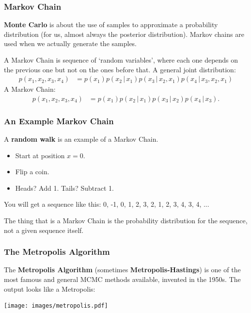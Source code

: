 \documentclass{beamer}
\newcommand{\given}{\,|\,}
\begin{document}
\begin{frame}
\frametitle{Markov Chain}
{\bf Monte Carlo} is about the use of samples to approximate a probability
distribution (for us, almost always the posterior distribution). Markov chains
are used when we actually generate the samples.
\pause

A Markov Chain is sequence of `random variables', where each one
depends on the previous one but not on the ones before that.
A general joint distribution:
\begin{align}
p(x_1, x_2, x_3, x_4) &= p(x_1)p(x_2 \given x_1)p(x_3 \given x_2, x_1)
                    p(x_4 \given x_3, x_2, x_1)
\end{align}
A Markov Chain:
\begin{align}
p(x_1, x_2, x_3, x_4) &= p(x_1)p(x_2 \given x_1)p(x_3 \given x_2)p(x_4 \given x_3).
\end{align}


\end{frame}


\begin{frame}
\frametitle{An Example Markov Chain}
A {\bf random walk} is an example of a Markov Chain.

\begin{itemize}
\item Start at position $x=0$.\pause
\item Flip a coin.\pause
\item Heads? Add 1. Tails? Subtract 1.\pause
\end{itemize}

You will get a sequence like this:
0, -1, 0, 1, 2, 3, 2, 1, 2, 3, 4, 3, 4, ...
\pause

The thing that is a Markov Chain is the probability distribution for the
sequence, not a given sequence itself.

\end{frame}


\begin{frame}
\frametitle{The Metropolis Algorithm}
The {\bf Metropolis Algorithm} (sometimes {\bf Metropolis-Hastings})
is one of the most famous and general
MCMC methods available, invented in the 1950s. The output looks like a Metropolis:
\begin{center}
\texttt{[image: images/metropolis.pdf]}
\end{center}

\end{frame}
\end{document}
